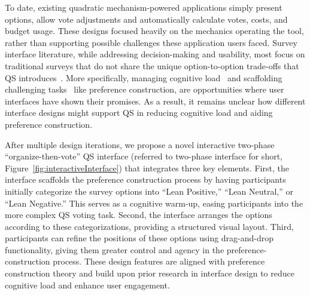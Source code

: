 To date, existing quadratic mechanism-powered applications simply present options, allow vote adjustments and automatically calculate votes, costs, and budget usage. These designs focused heavily on the mechanics operating the tool, rather than supporting possible challenges these application users faced. Survey interface literature, while addressing decision-making and usability, most focus on traditional surveys that do not share the unique option-to-option trade-offs that QS introduces~\cite{engstrom2020politics, weijtersEffectRatingScale2010, kierujVariationsResponseStyle2010, toepoelSmileysStarsHearts2019, farzandAestheticsEvaluatingResponse2024, pielotDidYouMisclick2024}. More specifically, managing cognitive load~\cite{paula2023, oviatt2006human, toepoelSmileysStarsHearts2019, softwareBrad2021, reis2012towards} and scaffolding challenging tasks~\cite{task2014, moderate2021, ibili2019effect, amyChatSensing2018} like preference construction, are opportunities where user interfaces have shown their promises. As a result, it remains unclear how different interface designs might support QS in reducing cognitive load and aiding preference construction.


After multiple design iterations, we propose a novel interactive two-phase ``organize-then-vote'' QS interface (referred to two-phase interface for short, Figure~\ref{fig:interactiveInterface}) that integrates three key elements. First, the interface scaffolds the preference construction process by having participants initially categorize the survey options into ``Lean Positive,'' ``Lean Neutral,'' or ``Lean Negative.'' This serves as a cognitive warm-up, easing participants into the more complex QS voting task. Second, the interface arranges the options according to these categorizations, providing a structured visual layout. Third, participants can refine the positions of these options using drag-and-drop functionality, giving them greater control and agency in the preference-construction process. These design features are aligned with preference construction theory and build upon prior research in interface design to reduce cognitive load and enhance user engagement.

